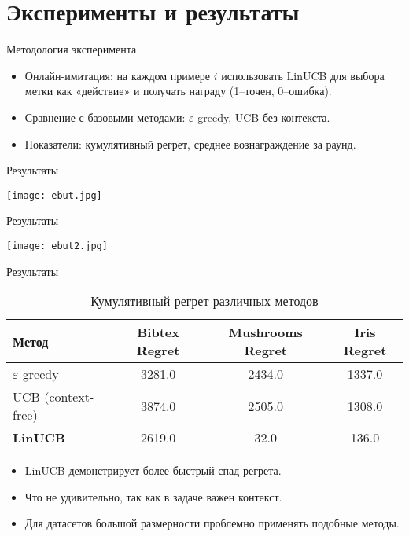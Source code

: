 \documentclass[10pt]{beamer}
\begin{document}
\section{Эксперименты и результаты}
\begin{frame}{Методология эксперимента}
  \begin{itemize}
    \item Онлайн-имитация: на каждом примере $i$ использовать LinUCB для выбора метки как «действие» и получать награду (1–точен, 0–ошибка).
    \item Сравнение с базовыми методами: $\varepsilon$-greedy, UCB без контекста.
    \item Показатели: кумулятивный регрет, среднее вознаграждение за раунд.
  \end{itemize}
\end{frame}
\begin{frame}{Результаты}
  \begin{center}
    \texttt{[image: ebut.jpg]}
  \end{center}
\end{frame}
\begin{frame}{Результаты}
  \begin{center}
    \texttt{[image: ebut2.jpg]}
  \end{center}
\end{frame}
\begin{frame}{Результаты}
  \begin{table}[ht]
    \centering
    \begin{tabular}{lccc}
      \hline
      \textbf{Метод} & \textbf{Bibtex Regret} & \textbf{Mushrooms Regret} & \textbf{Iris Regret} \\
      \hline
      $\varepsilon$-greedy &  3281.0 &  2434.0 & 1337.0 \\
      UCB (context-free) & 3874.0 & 2505.0 & 1308.0 \\
      \textbf{LinUCB } &2619.0& 32.0 & 136.0 \\
      \hline
    \end{tabular}
    \caption{Кумулятивный регрет различных методов}
  \end{table}
  \vspace{1em}
  \begin{itemize}
    \item LinUCB демонстрирует более быстрый спад регрета.
    \item Что не удивительно, так как в задаче важен контекст.
     \item Для датасетов большой размерности проблемно применять подобные методы.
  \end{itemize}
\end{frame}
\end{document}
